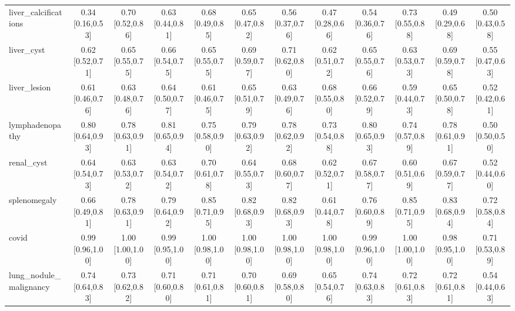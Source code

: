 \begin{tabular}{lccccccccccc}
liver\_calcifications & 0.34 [0.16,0.53] & 0.70 [0.52,0.86] & 0.63 [0.44,0.81] & 0.68 [0.49,0.85] & 0.65 [0.47,0.82] & 0.56 [0.37,0.76] & 0.47 [0.28,0.66] & 0.54 [0.36,0.76] & 0.73 [0.55,0.88] & 0.49 [0.29,0.68] & 0.50 [0.43,0.58] \\
liver\_cyst & 0.62 [0.52,0.71] & 0.65 [0.55,0.75] & 0.66 [0.54,0.75] & 0.65 [0.55,0.75] & 0.69 [0.59,0.77] & 0.71 [0.62,0.80] & 0.62 [0.51,0.72] & 0.65 [0.55,0.76] & 0.63 [0.53,0.73] & 0.69 [0.59,0.78] & 0.55 [0.47,0.63] \\
liver\_lesion & 0.61 [0.46,0.76] & 0.63 [0.48,0.76] & 0.64 [0.50,0.77] & 0.61 [0.46,0.75] & 0.65 [0.51,0.79] & 0.63 [0.49,0.76] & 0.68 [0.55,0.80] & 0.66 [0.52,0.79] & 0.59 [0.44,0.73] & 0.65 [0.50,0.78] & 0.52 [0.42,0.61] \\
lymphadenopathy & 0.80 [0.64,0.93] & 0.78 [0.63,0.91] & 0.81 [0.65,0.94] & 0.75 [0.58,0.90] & 0.79 [0.63,0.92] & 0.78 [0.62,0.92] & 0.73 [0.54,0.88] & 0.80 [0.65,0.93] & 0.74 [0.57,0.89] & 0.78 [0.61,0.91] & 0.50 [0.50,0.50] \\
renal\_cyst & 0.64 [0.54,0.73] & 0.63 [0.53,0.72] & 0.63 [0.54,0.72] & 0.70 [0.61,0.78] & 0.64 [0.55,0.73] & 0.68 [0.60,0.77] & 0.62 [0.52,0.71] & 0.67 [0.58,0.77] & 0.60 [0.51,0.69] & 0.67 [0.59,0.77] & 0.52 [0.44,0.60] \\
splenomegaly & 0.66 [0.49,0.81] & 0.78 [0.63,0.91] & 0.79 [0.64,0.92] & 0.85 [0.71,0.95] & 0.82 [0.68,0.93] & 0.82 [0.68,0.93] & 0.61 [0.44,0.78] & 0.76 [0.60,0.89] & 0.85 [0.71,0.95] & 0.83 [0.68,0.94] & 0.72 [0.58,0.84] \\
covid & 0.99 [0.96,1.00] & 1.00 [1.00,1.00] & 0.99 [0.95,1.00] & 1.00 [0.98,1.00] & 1.00 [0.98,1.00] & 1.00 [0.98,1.00] & 1.00 [0.98,1.00] & 0.99 [0.96,1.00] & 1.00 [1.00,1.00] & 0.98 [0.95,1.00] & 0.71 [0.53,0.89] \\
lung\_nodule\_malignancy & 0.74 [0.64,0.83] & 0.73 [0.62,0.82] & 0.71 [0.60,0.80] & 0.71 [0.61,0.81] & 0.70 [0.60,0.81] & 0.69 [0.58,0.80] & 0.65 [0.54,0.76] & 0.74 [0.63,0.83] & 0.72 [0.61,0.83] & 0.72 [0.61,0.81] & 0.54 [0.44,0.63] \\
\bottomrule
\end{tabular}
